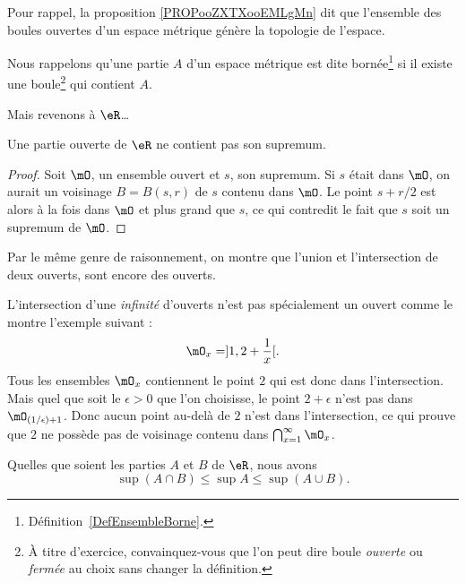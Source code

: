 Pour rappel, la proposition \ref{PROPooZXTXooEMLgMn} dit que l'ensemble des boules ouvertes d'un espace métrique génère la topologie de l'espace.

Nous rappelons qu'une partie \( A\) d'un espace métrique est dite bornée\footnote{Définition~\ref{DefEnsembleBorne}.} si il existe une boule\footnote{À titre d'exercice, convainquez-vous que l'on peut dire boule \emph{ouverte} ou \emph{fermée} au choix sans changer la définition.} qui contient \( A\).

Mais revenons à \( \eR \)\dots
\begin{lemma}  \label{LemSupOuvPas}
	Une partie ouverte de \( \eR\) ne contient pas son supremum.
\end{lemma}

\begin{proof}
	Soit \( \mO\), un ensemble ouvert et \( s\), son supremum. Si \( s\) était dans \( \mO\), on aurait un voisinage \( B=B(s,r)\) de \( s\) contenu dans \( \mO\). Le point \( s+r/2\) est alors à la fois dans \( \mO\) et plus grand que \( s\), ce qui contredit le fait que \( s\) soit un supremum de \( \mO\).
\end{proof}

Par le même genre de raisonnement, on montre que l'union et l'intersection de deux ouverts, sont encore des ouverts.

\begin{remark}
	L'intersection d'une \emph{infinité} d'ouverts n'est pas spécialement un ouvert comme le montre l'exemple suivant :
	\[
		\mO_x=]1,2+\frac{ 1 }{ x }[.
	\]
	Tous les ensembles \( \mO_x\) contiennent le point \( 2\) qui est donc dans l'intersection. Mais quel que soit le \( \epsilon>0\) que l'on choisisse, le point \( 2+\epsilon\) n'est pas dans \( \mO_{(1/\epsilon)+1}\). Donc aucun point au-delà de \( 2\) n'est dans l'intersection, ce qui prouve que \( 2\) ne possède pas de voisinage contenu dans \( \bigcap_{x=1}^{\infty}\mO_x\).
\end{remark}

\begin{proposition}     \label{PROPooANIOooIJHelX}
	Quelles que soient les parties \( A\) et \( B\) de \( \eR\), nous avons
	\begin{equation}
		\sup(A\cap B)\leq\sup A\leq\sup(A\cup B).
	\end{equation}
\end{proposition}

